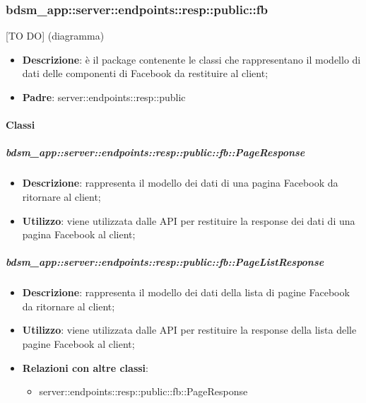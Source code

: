 \subsubsection{bdsm\_app::server::endpoints::resp::public::fb} %
\label{ssub:bdsm_app_server_endpoints_resp_public_fb}
[TO DO] (diagramma) \newline \newline

\begin{itemize}
  \item \textbf{Descrizione}: è il package contenente le classi che rappresentano il modello di dati delle componenti di Facebook da restituire al client;
  \item \textbf{Padre}: server::endpoints::resp::public
\end{itemize}

	\paragraph{Classi} %

    \subparagraph{bdsm\_app::server::endpoints::resp::public::fb::PageResponse} %
    \label{subp:bdsm_app_server_endpoints_resp_public_fb_pageresponse}
    \begin{itemize}
      \item \textbf{Descrizione}: rappresenta il modello dei dati di una pagina Facebook da ritornare al client;
      \item \textbf{Utilizzo}: viene utilizzata dalle API per restituire la response dei dati di una pagina Facebook al client;
      \end{itemize}

    \subparagraph{bdsm\_app::server::endpoints::resp::public::fb::PageListResponse} %
    \label{subp:bdsm_app_server_endpoints_resp_public_fb_pagelistresponse}
    \begin{itemize}
      \item \textbf{Descrizione}: rappresenta il modello dei dati della lista di pagine Facebook da ritornare al client;
      \item \textbf{Utilizzo}: viene utilizzata dalle API per restituire la response della lista delle pagine Facebook al client;
      \item \textbf{Relazioni con altre classi}:
        \begin{itemize}
          \item server::endpoints::resp::public::fb::PageResponse
        \end{itemize}
      \end{itemize}

